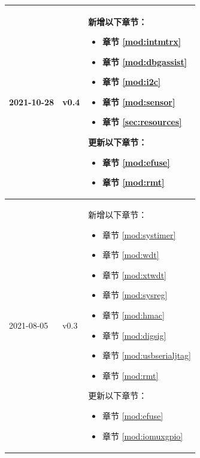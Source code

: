\begin{longtable}[l]{ | m{2cm} | m{1.5cm} | m{12cm} | }
    2021-10-28       & v0.4 &
        新增以下章节：
            \begin{itemize}
                 \item 章节 \ref{mod:intmtrx} \textit{\nameref{mod:intmtrx}}
                 \item 章节 \ref{mod:dbgassist} \textit{\nameref{mod:dbgassist}}
                \item 章节 \ref{mod:i2c} \textit{\nameref{mod:i2c}}
                \item 章节 \ref{mod:sensor} \textit{\nameref{mod:sensor}}
                \item 章节 \ref{sec:resources} \textit{\nameref{sec:resources}}
            \end{itemize}
        更新以下章节：
            \begin{itemize}
                \item 章节 \ref{mod:efuse} \textit{\nameref{mod:efuse}}
                \item 章节 \ref{mod:rmt} \textit{\nameref{mod:rmt}}
            \end{itemize} \\\hline
    2021-08-05 & v0.3 &
        新增以下章节：
            \begin{itemize}
                \item 章节 \ref{mod:systimer} \textit{\nameref{mod:systimer}}
                \item 章节 \ref{mod:wdt} \textit{\nameref{mod:wdt}}
                \item 章节 \ref{mod:xtwdt} \textit{\nameref{mod:xtwdt}}
                \item 章节 \ref{mod:sysreg} \textit{\nameref{mod:sysreg}}
                \item 章节 \ref{mod:hmac} \textit{\nameref{mod:hmac}}
                \item 章节 \ref{mod:digsig} \textit{\nameref{mod:digsig}}
                \item 章节 \ref{mod:usbserialjtag} \textit{\nameref{mod:usbserialjtag}}
                \item 章节 \ref{mod:rmt} \textit{\nameref{mod:rmt}}
            \end{itemize}
        更新以下章节：
            \begin{itemize}
                \item 章节 \ref{mod:efuse} \textit{\nameref{mod:efuse}}
                \item 章节 \ref{mod:iomuxgpio} \textit{\nameref{mod:iomuxgpio}}

\end{itemize}
\end{longtable}
